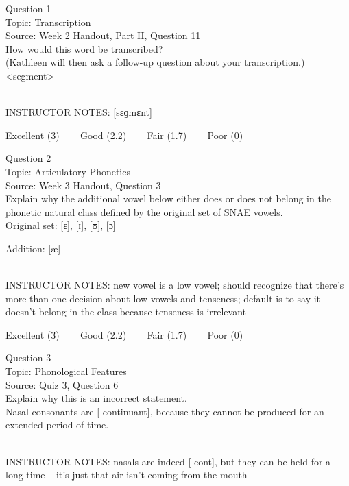 \documentclass[12pt]{article}
\begin{document}
{\large Question 1}\\

Topic: Transcription\\
Source: Week 2 Handout, Part II, Question 11\\

How would this word be transcribed?\\ (Kathleen will then ask a follow-up question about your transcription.)\\

<segment>


~\\
INSTRUCTOR NOTES: [sɛɡmɛnt]


\vfill
Excellent (3) ~~~ Good (2.2) ~~~ Fair (1.7) ~~~ Poor (0)
\newpage

{\large Question 2}\\

Topic: Articulatory Phonetics\\
Source: Week 3 Handout, Question 3\\

Explain why the additional vowel below either does or does not belong in the phonetic natural class defined by the original set of SNAE vowels.\\

Original set: {[ɛ]}, {[ɪ]}, {[ʊ]}, {[ɔ]}

Addition: {[æ]}


~\\
INSTRUCTOR NOTES: new vowel is a low vowel; should recognize that there's more than one decision about low vowels and tenseness; default is to say it doesn't belong in the class because tenseness is irrelevant


\vfill
Excellent (3) ~~~ Good (2.2) ~~~ Fair (1.7) ~~~ Poor (0)
\newpage

{\large Question 3}\\

Topic: Phonological Features\\
Source: Quiz 3, Question 6\\

Explain why this is an incorrect statement.\\

Nasal consonants are {[-continuant]}, because they cannot be produced for an extended period of time.


~\\
INSTRUCTOR NOTES: nasals are indeed [-cont], but they can be held for a long time -- it's just that air isn't coming from the mouth
\end{document}

